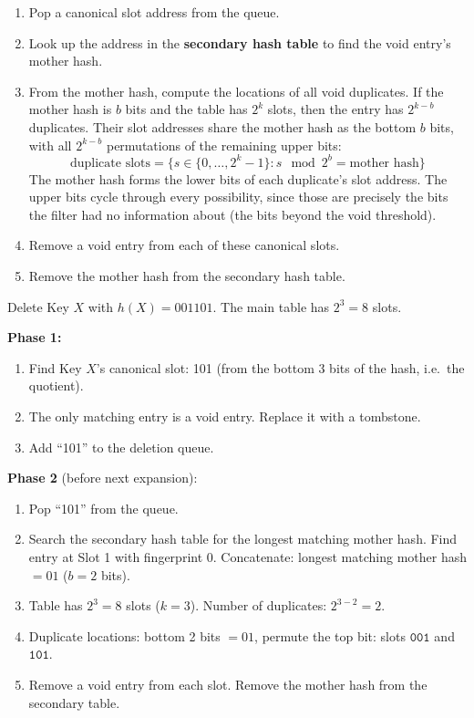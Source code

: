 \begin{enumerate}
  \item Pop a canonical slot address from the queue.
  \item Look up the address in the \textbf{secondary hash table} to 
        find the void entry's mother hash.
  \item From the mother hash, compute the locations of all void 
        duplicates. If the mother hash is $b$ bits and the table has 
        $2^k$ slots, then the entry has $2^{k-b}$ duplicates. Their 
        slot addresses share the mother hash as the bottom $b$ bits, 
        with all $2^{k-b}$ permutations of the remaining upper bits:
        \[
          \text{duplicate slots} = \{s \in \{0, \dots, 2^k - 1\} 
          : s \mod 2^b = \text{mother hash}\}
        \]
        The mother hash forms the lower bits of each duplicate's slot 
        address. The upper bits cycle through every possibility, since 
        those are precisely the bits the filter had no information 
        about (the bits beyond the void threshold).
  \item Remove a void entry from each of these canonical slots.
  \item Remove the mother hash from the secondary hash table.
\end{enumerate}

\begin{examplebox}
Delete Key $X$ with $h(X) = 001101$. The main table has $2^3 = 8$ 
slots.

\textbf{Phase 1:}
\begin{enumerate}
  \item Find Key $X$'s canonical slot: 101 (from the bottom 3 bits of 
        the hash, i.e.\ the quotient).
  \item The only matching entry is a void entry. Replace it with a 
        tombstone.
  \item Add ``101'' to the deletion queue.
\end{enumerate}

\textbf{Phase 2} (before next expansion):
\begin{enumerate}
  \item Pop ``101'' from the queue.
  \item Search the secondary hash table for the longest matching 
        mother hash. Find entry at Slot 1 with fingerprint 0. 
        Concatenate: longest matching mother hash $= 01$ ($b = 2$ bits).
  \item Table has $2^3 = 8$ slots ($k = 3$). Number of duplicates: 
        $2^{3-2} = 2$.
  \item Duplicate locations: bottom 2 bits $= 01$, permute the top 
        bit: slots $\texttt{001}$ and $\texttt{101}$.
  \item Remove a void entry from each slot. Remove the mother hash 
        from the secondary table.
\end{enumerate}
\end{examplebox}

